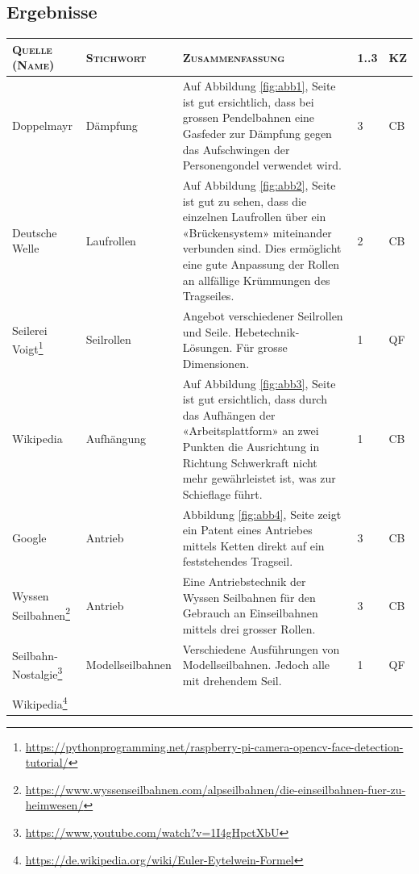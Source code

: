 \documentclass[a4paper,11pt]{scrartcl}
\begin{document}
\begin{landscape}
\subsection{Ergebnisse}

\renewcommand*{\arraystretch}{1.2}
{\small
\begin{longtable}{|p{4cm}|p{4cm}|p{12cm}|l|l|}
\hline
\textsc{Quelle (Name)} & \textsc{Stichwort} & \textsc{Zusammenfassung} & \textsc{1..3} & \textsc{KZ} \\
\hline

Doppelmayr
& Dämpfung
& Auf Abbildung \ref{fig:abb1}, Seite \pageref{fig:abb1} ist gut ersichtlich, dass bei grossen Pendelbahnen eine Gasfeder zur Dämpfung gegen das Aufschwingen der Personengondel verwendet wird.
& 3 
& CB \\
Deutsche Welle
& Laufrollen
& Auf Abbildung \ref{fig:abb2}, Seite \pageref{fig:abb2} ist gut zu sehen, dass die einzelnen Laufrollen über ein «Brückensystem» miteinander verbunden sind. Dies ermöglicht eine gute Anpassung der Rollen an allfällige Krümmungen des Tragseiles.
& 2 
& CB \\
Seilerei Voigt\footnote{\url{https://pythonprogramming.net/raspberry-pi-camera-opencv-face-detection-tutorial/}}
& Seilrollen
& Angebot verschiedener Seilrollen und Seile. Hebetechnik-Lösungen. Für grosse Dimensionen.
& 1 
& QF \\
Wikipedia
& Aufhängung
& Auf Abbildung \ref{fig:abb3}, Seite \pageref{fig:abb3} ist gut ersichtlich, dass durch das Aufhängen der «Arbeitsplattform» an zwei Punkten die Ausrichtung in Richtung Schwerkraft nicht mehr gewährleistet ist, was zur Schieflage führt.
& 1 
& CB \\
Google
& Antrieb
& Abbildung \ref{fig:abb4}, Seite \pageref{fig:abb4} zeigt ein Patent eines Antriebes mittels Ketten direkt auf ein feststehendes Tragseil.
& 3 
& CB \\
Wyssen Seilbahnen\footnote{\url{https://www.wyssenseilbahnen.com/alpseilbahnen/die-einseilbahnen-fuer-zu-heimwesen/}}
& Antrieb
& Eine Antriebstechnik der Wyssen Seilbahnen für den Gebrauch an Einseilbahnen mittels drei grosser Rollen.
& 3 
& CB \\
Seilbahn-Nostalgie\footnote{\url{https://www.youtube.com/watch?v=1I4gHpctXbU}}
& Modellseilbahnen
& Verschiedene Ausführungen von Modellseilbahnen. Jedoch alle mit drehendem Seil.
& 1 
& QF \\
Wikipedia\footnote{\url{https://de.wikipedia.org/wiki/Euler-Eytelwein-Formel}}

\end{longtable}}
\end{landscape}
\end{document}

